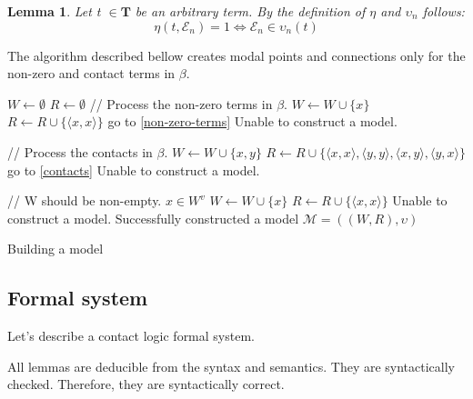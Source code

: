 \documentclass{article}
\newcommand\M{\mathcal{M}}
\newcommand\E{\mathcal{E}}
\newcommand\Tb{\mathbf{T}}
\newtheorem{lemma}[theorem]{Lemma}
\newcommand{\pair}[2]{ \langle #1, #2 \rangle }
\newcommand{\pairXY}{ \pair{x}{y} }
\newcommand{\pairXX}{ \pair{x}{x} }
\newcommand{\pairYX}{ \pair{y}{x} }
\newcommand{\pairYY}{ \pair{y}{y} }
\begin{document}
		\begin{lemma}
			Let t $\in \Tb$ be an arbitrary term. By the definition of $\eta$ and $\upsilon_n$ follows:
			\begin{equation}
				\eta(t, \E_n) = 1 \iff \E_n \in \upsilon_n(t)
			\end{equation}
		\end{lemma}

	The algorithm described bellow creates modal points and connections only for the non-zero and contact terms in $\beta$.

	\newpage

	\begin{algorithm}[H]
	\renewcommand\thealgorithm{} %
	\begin{algorithmic}[1] %
		\STATE $W \gets \emptyset$
		\STATE $R \gets \emptyset$
		\STATE // Process the non-zero terms in $\beta$.
		 \label{non-zero-terms}
					\STATE $W \gets W \cup \{ x \}$
					\STATE $R \gets R \cup \{ \pairXX \}$
					\STATE go to \ref{non-zero-terms}
				\ENDIF
			\ENDFOR
			\STATE Unable to construct a model.
		\ENDFOR

		\STATE // Process the contacts in $\beta$.
		 \label{contacts}
					\STATE $W \gets W \cup \{x, y \}$
					\STATE $R \gets R \cup \{\pairXX, \pairYY, \pairXY, \pairYX \}$
					\STATE go to \ref{contacts}
				\ENDIF
			\ENDFOR
			\STATE Unable to construct a model.
		\ENDFOR

		\STATE // W should be non-empty.
				\STATE $x \in W^v$
				\STATE $W \gets W \cup \{ x \}$
				\STATE $R \gets R \cup \{ \pairXX \}$
			\ELSE
				\STATE Unable to construct a model.
			\ENDIF
		\ENDIF
		\STATE Successfully constructed a model $\M = ((W, R), \upsilon)$
	\end{algorithmic}

	\caption{Building a model}
	\label{alg:seq}
	\end{algorithm}
	\newpage

	\subsection{Formal system}
	Let's describe a contact logic formal system.

	All lemmas are deducible from the syntax and semantics. They are syntactically checked. Therefore, they are syntactically correct.
\end{document}
